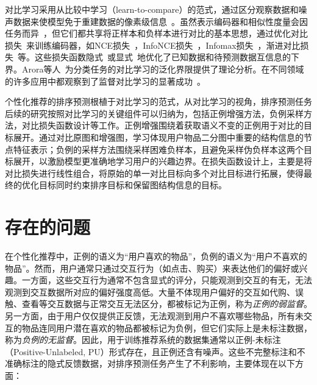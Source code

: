对比学习采用从比较中学习（learn-to-compare）\cite{Gutmann:2010:ICAIS}的范式，通过区分观察数据和噪声数据来使模型免于重建数据的像素级信息~\cite{Oord:2018:arxiv}。虽然表示编码器和相似性度量会因任务而异~\cite{Devlin:2018:bert,He:2020:CVPR,Dosovitskiy:2014:NIPS,Xiangnan:2020:SIGIR,Wang:2019:SIGIR,Wenqi:2021:KDD}，但它们都共享将正样本和负样本进行对比的基本思想，通过优化对比损失~\cite{Wang:2020:ICML}来训练编码器，如NCE损失~\cite{Gutmann:2010:ICAIS}，InfoNCE损失~\cite{Oord:2018:arxiv}，Infomax损失~\cite{Hjelm:2018:Arxiv}，渐进对比损失~\cite{Wang:2020:ICML}等。这些损失函数隐式~\cite{Oord:2018:arxiv}或显式~\cite{Hjelm:2018:Arxiv}地优化了已知数据和待预测数据互信息的下界。Arora等人~\cite{Saunshi:2019:ICML}为分类任务的对比学习的泛化界限提供了理论分析。在不同领域的许多应用中都观察到了监督对比学习的显著成功~\cite{Henaff:2020:ICML,Khosla:2020:NIPS,Liu:2021:TKDE,Bachman:2019:NIPS,chen2020improved,Huang:2019:ICML,Wu:2018:CVPR,Zhuang:2019:CVPR}。


个性化推荐的排序预测根植于对比学习的范式，从对比学习的视角，排序预测任务后续的研究按照对比学习的关键组件可以归纳为，包括正例增强方法，负例采样方法，对比损失函数设计等工作。正例增强围绕着获取语义不变的正例用于对比的目标展开。通过对比原图和增强图，学习体现用户物品二分图中重要的结构信息的节点特征表示\cite{lightgcl:2023:ICLR,ren2023disentangled,he2023candidate,yang2023generative}；负例的采样方法围绕采样困难负样本\cite{Steffen:2014:WSDM,Zhang:2013:SIGIR,Zhao:2015:CIKM,Bin:2023:ICDE,shi2023theories}，且避免采样伪负样本\cite{Ding:2020:NIPS,Qin:2021:AAAI,Zhao:2021:IJCAI,Chen:2017:KDD,Mikolov:2013:NIPS,Weike:2013:IJCAI,Yu:2018:CIKM,Wang:2019:SIGIR}这两个目标展开，以激励模型更准确地学习用户的兴趣边界。在损失函数设计上，主要是将对比损失进行线性组合，将原始的单一对比目标向多个对比目标进行拓展，使得最终的优化目标同时约束排序目标和保留图结构信息的目标\cite{Wang:2022:KDD,ren2023disentangled,lightgcl:2023:ICLR,he2023candidate,zhu2023adamcl,qin2023meta,shuai2022review}。


\section{存在的问题}
在个性化推荐中，正例的语义为“用户喜欢的物品”，负例的语义为“用户不喜欢的物品”。然而，用户通常只通过交互行为（如点击、购买）来表达他们的偏好或兴趣。一方面，这些交互行为通常不包含显式的评分，只能观测到交互的有无，无法观测到交互数据所对应的偏好强度高低。大量不体现用户偏好的交互如代购、误触、查看等交互数据与正常交互无法区分，都被标记为正例，称为\textit{正例的弱监督}。另一方面，由于用户仅仅提供正反馈，无法观测到用户不喜欢哪些物品，所有未交互的物品连同用户潜在喜欢的物品都被标记为负例，但它们实际上是未标注数据，称为\textit{负例的无监督}。因此，用于训练推荐系统的数据集通常以正例-未标注（Positive-Unlabeled, PU）形式存在，且正例还含有噪声。这些不完整标注和不准确标注的隐式反馈数据，对排序预测任务产生了不利影响，主要体现在以下方面：

